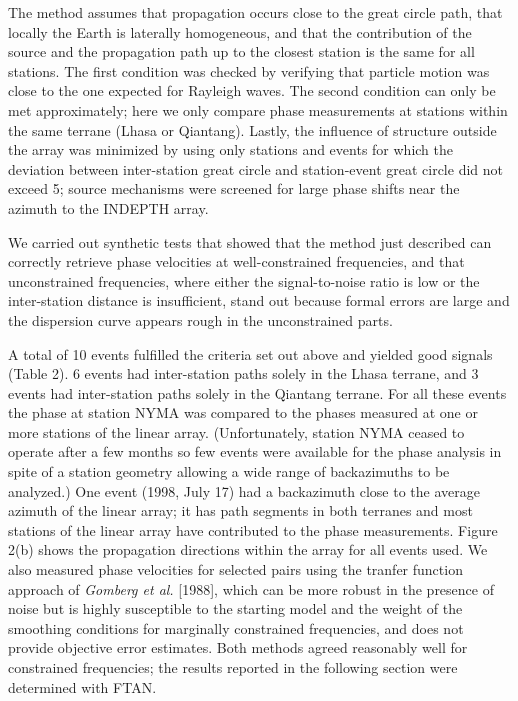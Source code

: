 \documentclass[12pt]{article}
\begin{document}
The method assumes that propagation occurs close to the great circle path, that locally the Earth is
laterally homogeneous, and that the contribution of the source and the propagation path up to the closest
station is the same for all stations.  The first condition was checked by verifying that particle motion
was close to the one expected for Rayleigh waves.  The second condition can only be met approximately; here
we only compare phase measurements at stations within the same terrane (Lhasa or Qiantang).  Lastly, the
influence of structure outside the array was minimized by using only stations and events for which the
deviation between inter-station great circle and station-event great circle did not exceed 5\dg; source
mechanisms were screened for large phase shifts near the azimuth to the INDEPTH array.

We carried out synthetic tests that showed that the method just described can correctly retrieve phase
velocities at well-constrained frequencies, and that unconstrained frequencies, where either the
signal-to-noise ratio is low or the inter-station distance is insufficient, stand out because formal errors
are large and the dispersion curve appears rough in the unconstrained parts.

A total of 10 events fulfilled the criteria set out above and yielded good signals (Table 2).  6 events had
inter-station paths solely in the Lhasa terrane, and 3 events had inter-station paths solely in the
Qiantang terrane.  For all these events the phase at station NYMA was compared to the phases measured at
one or more stations of the linear array. (Unfortunately, station NYMA ceased to operate after a few months
so few events were available for the phase analysis in spite of a station geometry allowing a wide range of
backazimuths to be analyzed.)  One event (1998, July 17) had a backazimuth close to the average azimuth of
the linear array; it has path segments in both terranes and most stations of the linear array have
contributed to the phase measurements.  Figure 2(b) shows the propagation directions within the array for
all events used.  We also measured phase velocities for selected pairs using the tranfer function approach
of {\it Gomberg et al.} [1988], which can be more robust in the presence of noise but is highly susceptible
to the starting model and the weight of the smoothing conditions for marginally constrained frequencies, and does not provide objective error estimates.
Both methods agreed reasonably well for constrained frequencies; the results reported in
the following section were determined with FTAN.
\end{document}
